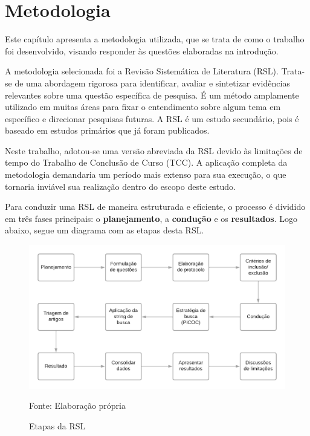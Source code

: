\chapter[Metodologia]{Metodologia}

Este capítulo apresenta a metodologia utilizada, que se trata de como o trabalho foi desenvolvido, visando responder às questões elaboradas na introdução.

A metodologia selecionada foi a Revisão Sistemática de Literatura (RSL). Trata-se de uma abordagem rigorosa para identificar, avaliar e sintetizar evidências relevantes sobre uma questão específica de pesquisa. É um método amplamente utilizado em muitas áreas para fixar o entendimento sobre algum tema em específico e direcionar pesquisas futuras. A RSL é um estudo secundário, pois é baseado em estudos primários que já foram publicados.

Neste trabalho, adotou-se uma versão abreviada da RSL devido às limitações de tempo do Trabalho de Conclusão de Curso (TCC). A aplicação completa da metodologia demandaria um período mais extenso para sua execução, o que tornaria inviável sua realização dentro do escopo deste estudo.

Para conduzir uma RSL de maneira estruturada e eficiente, o processo é dividido em três fases principais: o \textbf{planejamento}, a \textbf{condução} e os \textbf{resultados}. Logo abaixo, segue um diagrama com as etapas desta RSL.

\begin{figure}[h]
	\centering %
	\includegraphics[width=16cm]{figuras/diagrama-RSL.png} %
	\caption{Etapas da RSL}
	Fonte: Elaboração própria
	\label{figura:diagrama rsl}
\end{figure}

